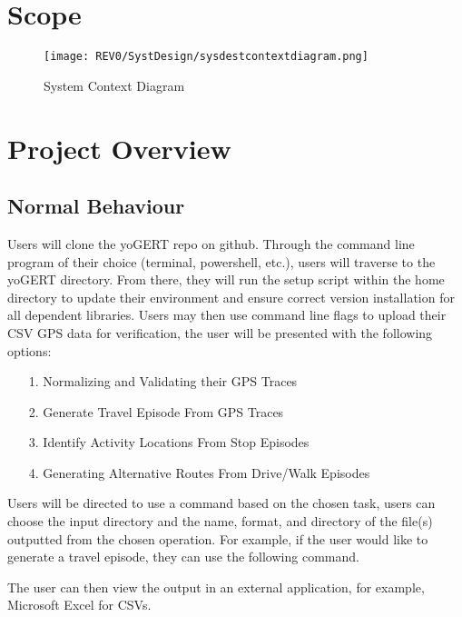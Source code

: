 \documentclass[12pt, titlepage]{article}
\begin{document}
\section{Scope}
\begin{figure}[!h]
    \centering
    \texttt{[image: REV0/SystDesign/sysdestcontextdiagram.png]}
    \caption{System Context Diagram}
    \label{fig:System_Context_Diagram}
\end{figure}


\newpage
\section{Project Overview}

\subsection{Normal Behaviour}
Users will clone the yoGERT repo on github. Through the command line program of their choice (terminal, powershell, etc.), users will traverse to the yoGERT directory. From there, they will run the setup script within the home directory to update their environment and ensure correct version installation for all dependent libraries. Users may then use command line flags to upload their CSV GPS data for verification, the user will be presented with the following options:

\begin{itemize}
    \item[1.] Normalizing and Validating their GPS Traces
    \item[2.] Generate Travel Episode From GPS Traces
    \item[3.] Identify Activity Locations From Stop Episodes
    \item[4.] Generating Alternative Routes From Drive/Walk Episodes
\end{itemize}

\noindent Users will be directed to use a command based on the chosen task, users can choose the input directory and the name, format, and directory of the file(s) outputted from the chosen operation. For example, if the user would like to generate a travel episode, they can use the following command.



The user can then view the output in an external application, for example, Microsoft Excel for CSVs. 
\end{document}
